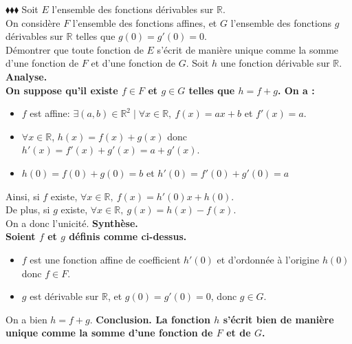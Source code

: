 \documentclass[11pt]{article}
\begin{document}
\pagebreak

\begin{exercice}{$\blacklozenge\blacklozenge\blacklozenge$}{}
    Soit $E$ l'ensemble des fonctions dérivables sur $\mathbb{R}$.\\
    On considère $F$ l'ensemble des fonctions affines, et $G$ l'ensemble des fonctions $g$ dérivables sur $\mathbb{R}$ telles que $g(0)=g'(0)=0$.\\
    Démontrer que toute fonction de $E$ s'écrit de manière unique comme la somme d'une fonction de $F$ et d'une fonction de $G$.
    \tcblower
    Soit $h$ une fonction dérivable sur $\mathbb{R}$.\n
    \bf{Analyse.}\\
    On suppose qu'il existe $f\in F$ et $g\in G$ telles que $h=f+g$. On a :
    \begin{itemize}[topsep=0pt,itemsep=-0.9 ex]
        \item $f$ est affine: $\exists(a,b)\in\mathbb{R}^2\mid\forall{x\in\mathbb{R}}, ~ f(x)=ax+b$ et $f'(x)=a$.  
        \item $\forall{x\in\mathbb{R}}$, $h(x)=f(x)+g(x)$ donc $h'(x)=f'(x)+g'(x)=a+g'(x)$.
        \item $h(0)=f(0)+g(0)=b$ et $h'(0)=f'(0)+g'(0)=a$
    \end{itemize}
    Ainsi, si $f$ existe, $\forall{x\in\mathbb{R}}, ~ f(x) = h'(0)x+h(0)$.\\
    De plus, si $g$ existe, $\forall{x\in\mathbb{R}}, ~ g(x) = h(x)-f(x)$.\\
    On a donc l'unicité.\n
    \bf{Synthèse.}\\
    Soient $f$ et $g$ définis comme ci-dessus.
    \begin{itemize}[topsep=0pt,itemsep=-0.9 ex]
        \item $f$ est une fonction affine de coefficient $h'(0)$ et d'ordonnée à l'origine $h(0)$ donc $f\in F$.
        \item $g$ est dérivable sur $\mathbb{R}$, et $g(0)=g'(0)=0$, donc $g\in G$. 
    \end{itemize}
    On a bien $h=f+g$.\n
    \bf{Conclusion.} La fonction $h$ s'écrit bien de manière unique comme la somme d'une fonction de $F$ et de $G$.
\end{exercice}
\end{document}
